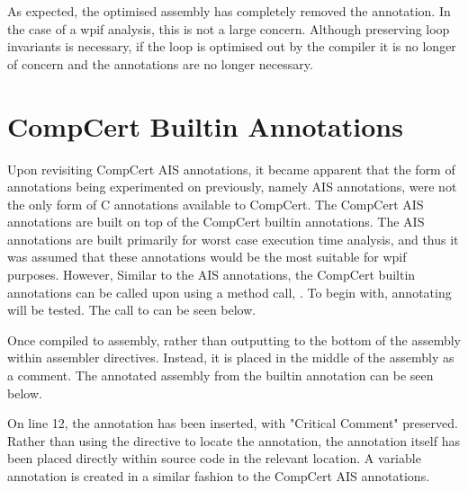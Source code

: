 

As expected, the optimised assembly has completely removed the annotation. In the case of a wpif analysis, this is not a large concern. Although preserving loop invariants is necessary, if the loop is optimised out by the compiler it is no longer of concern and the annotations are no longer necessary.


\section{CompCert Builtin Annotations}

Upon revisiting CompCert AIS annotations, it became apparent that the form of annotations being experimented on previously, namely AIS annotations, were not the only form of C annotations available to CompCert. The CompCert AIS annotations are built on top of the CompCert builtin annotations. The AIS annotations are built primarily for worst case execution time analysis, and thus it was assumed that these annotations would be the most suitable for wpif purposes. However,  Similar to the AIS annotations, the CompCert builtin annotations can be called upon using a method call, . To begin with, annotating  will be tested. The call to  can be seen below.



Once compiled to assembly, rather than outputting to the bottom of the assembly within assembler directives. Instead, it is placed in the middle of the assembly as a comment. The annotated assembly from the builtin annotation can be seen below.



On line 12, the annotation has been inserted, with "Critical Comment" preserved. Rather than using the  directive to locate the annotation, the annotation itself has been placed directly within source code in the relevant location. A variable annotation is created in a similar fashion to the CompCert AIS annotations. 



